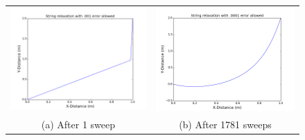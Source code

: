 \documentclass[11pt]{article}
\begin{document}
\begin{figure}[H]
\centering
\begin{tabular}{cc}
\includegraphics[scale=.3]{1_relaxation(001).png} & \includegraphics[scale=.3]{1_relaxation(0001).png} \\
(a) After 1 sweep & (b) After 1781 sweeps \\[6pt]



\end{tabular}
\end{figure}
\end{document}
